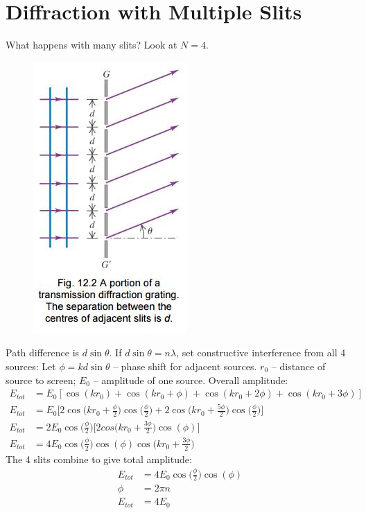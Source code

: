 \documentclass[a4paper, 11pt, normalem]{report}
\begin{document}
\section{Diffraction with Multiple Slits}
What happens with many slits?
Look at $N = 4$.
\begin{figure}[H]
    \centering
    \includegraphics[scale=0.8]{Grating.jpg}
\end{figure}
Path difference is $d\sin{\theta}$.
If $d\sin{\theta} = n\lambda$, set constructive interference from all 4 sources: 
Let $\phi = kd\sin{\theta}$ -- phase shift for adjacent sources.
$r_{0}$ -- distance of source to screen; $E_{0}$ -- amplitude of one source.
Overall amplitude:
\begin{align}
    E_{tot} &= E_{0}[\cos{(kr_{0})} + \cos{(kr_{0} + \phi)} + \cos{(kr_{0} + 2\phi)} + \cos{(kr_{0} + 3\phi)}] \\
    E_{tot} &= E_{0}\bigg[2\cos{\big(kr_{0} + \tfrac{\phi}{2}\big)}\cos{\big(\tfrac{\phi}{2}\big)} + 2\cos{\big(kr_{0} + \tfrac{5\phi}{2}\big)}\cos{\big(\tfrac{\phi}{2}\big)}\bigg] \\
    E_{tot} &= 2E_{0}\cos{\big(\tfrac{\phi}{2}\big)}\bigg[2cos{\big(kr_{0} + \tfrac{3\phi}{2}\big)}\cos{(\phi)}\bigg] \\
    E_{tot} &= 4E_{0}\cos{\big(\tfrac{\phi}{2}\big)}\cos{(\phi)}\cos{\big(kr_{0} + \tfrac{3\phi}{2}\big)}
\end{align}
The 4 slits combine to give total amplitude:
\begin{align}
    E_{tot} &= 4E_{0}\cos{\big(\tfrac{\phi}{2}\big)}\cos{(\phi)} \\
    \phi &= 2\pi n \\
    E_{tot} &= 4E_{0}
\end{align}
\end{document}
